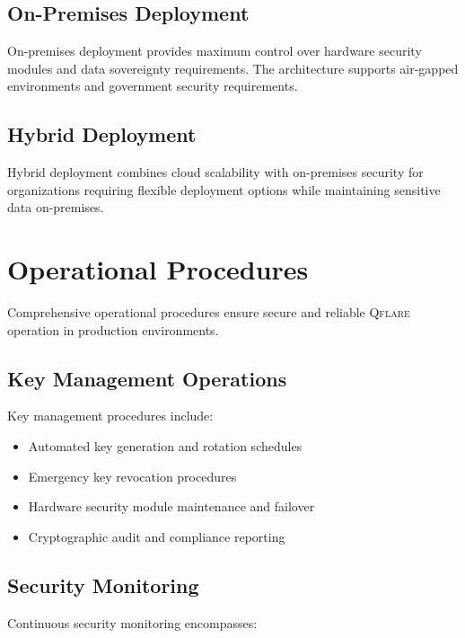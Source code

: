 ﻿\documentclass[12pt,a4paper,twoside]{book}
\newcommand{\qflare}{\textsc{Qflare}}
\begin{document}
\subsection{On-Premises Deployment}
\label{subsec:onprem-deployment}

On-premises deployment provides maximum control over hardware security modules and data sovereignty requirements. The architecture supports air-gapped environments and government security requirements.

\subsection{Hybrid Deployment}
\label{subsec:hybrid-deployment}

Hybrid deployment combines cloud scalability with on-premises security for organizations requiring flexible deployment options while maintaining sensitive data on-premises.

\section{Operational Procedures}
\label{sec:operational-procedures}

Comprehensive operational procedures ensure secure and reliable \qflare{} operation in production environments.

\subsection{Key Management Operations}
\label{subsec:key-mgmt-ops}

Key management procedures include:

\begin{itemize}
\item Automated key generation and rotation schedules
\item Emergency key revocation procedures
\item Hardware security module maintenance and failover
\item Cryptographic audit and compliance reporting
\end{itemize}

\subsection{Security Monitoring}
\label{subsec:security-monitoring}

Continuous security monitoring encompasses:
\end{document}
